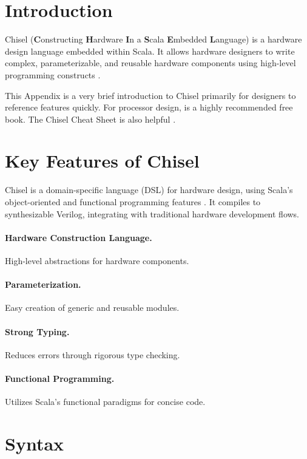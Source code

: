 \section{Introduction}
Chisel (\textbf{C}onstructing \textbf{H}ardware \textbf{I}n a \textbf{S}cala \textbf{E}mbedded \textbf{L}anguage) is a hardware design language embedded within Scala. It allows hardware designers to write complex, parameterizable, and reusable hardware components using high-level programming constructs \cite{bachrach2012chisel}. 

This Appendix is a very brief introduction to Chisel primarily for designers to reference features quickly. For processor design, \citep{chisel:book} is a highly recommended free book. The Chisel Cheat Sheet is also helpful \cite{chiselcheatsheet}.

\section{Key Features of Chisel}
Chisel is a domain-specific language (DSL) for hardware design, using Scala's object-oriented and functional programming features \cite{chisel-doc}. It compiles to synthesizable Verilog, integrating with traditional hardware development flows.

\paragraph{Hardware Construction Language.} High-level abstractions for hardware components.
\paragraph{Parameterization.} Easy creation of generic and reusable modules.
\paragraph{Strong Typing.} Reduces errors through rigorous type checking.
\paragraph{Functional Programming.} Utilizes Scala's functional paradigms for concise code.


\section{Syntax}

